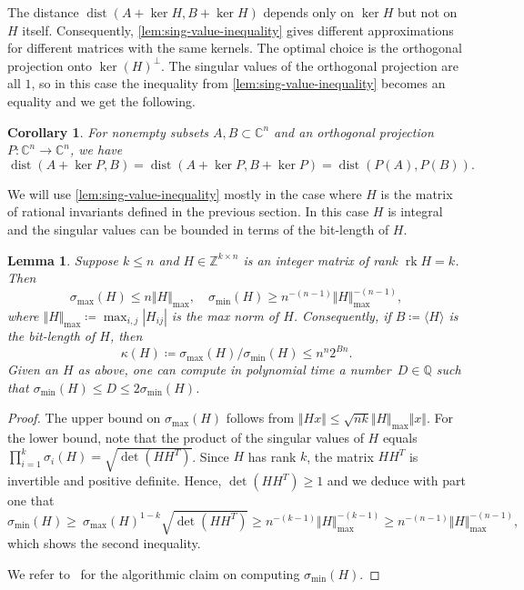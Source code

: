 \documentclass[10pt,a4paper]{article}
\newtheorem{lemma}[theorem]{Lemma}
\newtheorem{corollary}[theorem]{Corollary}
\theoremstyle{definition}
\DeclareMathOperator{\rk}{rk}
\DeclareMathOperator{\dist}{dist}
\newcommand{\QQ}{\mathbb{Q}}
\newcommand{\CC}{\mathbb{C}}
\newcommand{\ZZ}{\mathbb{Z}}
\numberwithin{equation}{section}
\begin{document}
The distance $\dist(A+\ker H, B+\ker H)$ depends only on $\ker H$ but not on $H$ itself.
Consequently, \cref{lem:sing-value-inequality} gives different approximations for different matrices with the same kernels.
The optimal choice is the orthogonal projection onto $\ker(H)^\perp$.
The singular values of the orthogonal projection are all $1$, so in this case the inequality from \cref{lem:sing-value-inequality}
becomes an equality and we get the following.

\begin{corollary}\label{cor:ort-proj-dist}
For nonempty subsets $A,B\subset\CC^n$ and an orthogonal projection $P:\CC^n\rightarrow \CC^n$, we have
\[
  \dist(A+\ker P, B ) = \dist(A+\ker P, B+\ker P ) = \dist(P(A), P(B) ).
\]
\end{corollary}

We will use \cref{lem:sing-value-inequality} mostly in the case where $H$ is the matrix of rational invariants
defined in the previous section. In this case $H$ is integral and the singular values can be bounded
in terms of the bit-length of $H$.

\begin{lemma}
\label{lem:singular}
Suppose $k\leq n$ and $H\in\ZZ^{k\times n}$ is an integer matrix of rank $\rk H=k$. Then
\[
   \sigma_{\max}(H)\leq n \Vert H\Vert_{\max},\quad \sigma_{\min}(H) \geq n^{-(n-1)} \Vert H\Vert_{\max}^{-(n-1)},
\]
where $\Vert H\Vert_{\max}\coloneqq\max_{i,j}|H_{ij}|$ is the max norm of $H$.
Consequently, if $B\coloneqq\langle H\rangle$ is the bit-length of $H$, then
\[
     \kappa(H)\coloneqq \sigma_{\max}(H)/\sigma_{\min}(H) \leq n^n 2^{Bn}.
\]
Given an $H$ as above, one can compute in polynomial time a number~$D\in\QQ$ such that
$\sigma_{\min}(H) \le D \le 2 \sigma_{\min}(H)$.
\end{lemma}

\begin{proof}
The upper bound on $\sigma_{\max}(H)$ follows from
$\Vert Hx\Vert  \leq  \sqrt{nk}\Vert H\Vert_{\max} \Vert x\Vert $.
For the lower bound, note that the product of the singular values of $H$ equals
$\prod_{i=1}^k \sigma_i(H)=\sqrt{\det(HH^T)}$.
Since $H$ has rank $k$, the matrix $HH^T$ is invertible and positive definite.
Hence, $\det(HH^T)\geq 1$ and we deduce with part one that
\[
  \sigma_{\min}(H) \geq \  \sigma_{\max}(H)^{1-k}  \sqrt{\det(HH^T)} \geq n^{-(k-1)}\Vert H\Vert_{\max}^{-(k-1)}
    \geq n^{-(n-1)}\Vert H\Vert_{\max}^{-(n-1)},
\]
which shows the second inequality.

We refer to~\cite{pan-chen:99} for the algorithmic claim on computing $\sigma_{\min}(H)$.
\end{proof}
\end{document}
